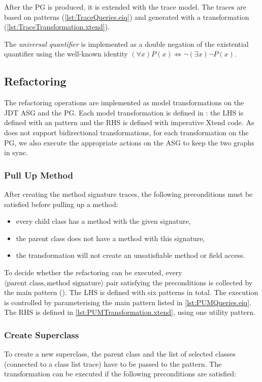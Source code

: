 \documentclass[submission,copyright,creativecommons]{eptcs}
\begin{document}
After the PG is produced, it is extended with the trace model. The traces are based on \eiq patterns (\autoref{lst:TraceQueries.eiq}) and generated with a \viatra transformation (\autoref{lst:TraceTransformation.xtend}).

The \emph{universal quantifier} is implemented as a double negation of the existential quantifier using the well-known identity $(\forall x) P(x) \Leftrightarrow \neg (\exists x) \neg P(x)$.

\subsection[Refactoring]{Refactoring\qquad{}}

The refactoring operations are implemented as model transformations on the JDT ASG and the PG. Each model transformation is defined in \viatra: the LHS is defined with an \eiq pattern and the RHS is defined with imperative Xtend code. As \viatra does not support bidirectional transformations, for each transformation on the PG, we also execute the appropriate actions on the ASG to keep the two graphs in sync.

\subsubsection{Pull Up Method}
After creating the method signature traces, the following preconditions must be satisfied before pulling up a method:

\begin{itemize}[noitemsep]
	 \item every child class has a method with the given signature,
	 \item the parent class does not have a method with this signature,
	 \item the transformation will not create an unsatisfiable method or field access.
\end{itemize}

To decide whether the refactoring can be executed, every $\langle \text{parent class}, \text{method signature} \rangle$ pair satisfying the preconditions is collected by the main pattern (). The LHS is defined with six patterns in total. The execution is controlled by parameterising the main pattern listed in \autoref{lst:PUMQueries.eiq}. The RHS is defined in \autoref{lst:PUMTransformation.xtend}, using one utility pattern.

\subsubsection{Create Superclass}
To create a new superclass, the parent class and the list of selected classes (connected to a class list trace) have to be passed to the pattern. The transformation can be executed if the following preconditions are satisfied:
\end{document}
